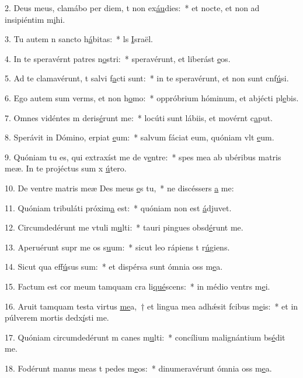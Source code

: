 2. Deus meus, clamábo per diem, t non ex\uline{áu}dies:~* et nocte, et non ad insipiéntim m\uline{i}hi.\par 
3. Tu autem n sancto h\uline{á}bitas:~* ls \uline{I}sraël.\par 
4. In te speravérnt patres n\uline{o}stri:~* speravérunt, et liberást \uline{e}os.\par 
5. Ad te clamavérunt, t salvi f\uline{a}cti sunt:~* in te speravérunt, et non sunt cnf\uline{ú}si.\par 
6. Ego autem sum verms, et non h\uline{o}mo:~* oppróbrium hóminum, et abjécti pl\uline{e}bis.\par 
7. Omnes vidéntes m deris\uline{é}runt me:~* locúti sunt lábiis, et movérnt c\uline{a}put.\par 
8. Sperávit in Dómino, erpiat \uline{e}um:~* salvum fáciat eum, quóniam vlt \uline{e}um.\par 
9. Quóniam tu es, qui extraxíst me de v\uline{e}ntre:~* spes mea ab ubéribus matris meæ. In te projéctus sum x \uline{ú}tero.\par 
10. De ventre matris meæ Des meus \uline{e}s tu,~* ne discéssers \uline{a} me:\par 
11. Quóniam tribuláti próxim\uline{a} est:~* quóniam non est  \uline{á}djuvet.\par 
12. Circumdedérunt me vtuli m\uline{u}lti:~* tauri pingues obsd\uline{é}runt me.\par 
13. Aperuérunt supr me os s\uline{u}um:~* sicut leo rápiens t r\uline{ú}giens.\par 
14. Sicut qua eff\uline{ú}sus sum:~* et dispérsa sunt ómnia oss m\uline{e}a.\par 
15. Factum est cor meum tamquam cra li\uline{qué}scens:~* in médio ventrs m\uline{e}i.\par 
16. Aruit tamquam testa virtus \uline{me}a,~† et lingua mea adhǽsit fcibus m\uline{e}is:~* et in púlverem mortis dedx\uline{í}sti me.\par 
17. Quóniam circumdedérunt m canes m\uline{u}lti:~* concílium malignántium bs\uline{é}dit me.\par 
18. Fodérunt manus meas t pedes m\uline{e}os:~* dinumeravérunt ómnia oss m\uline{e}a.\par 
